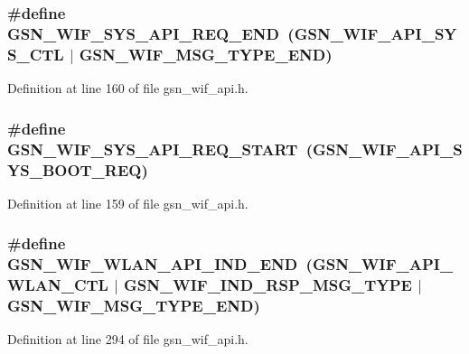 \hypertarget{a00606_ad4f159041961543262f326993fa41304}{
\subsubsection[{GSN\_\-WIF\_\-SYS\_\-API\_\-REQ\_\-END}]{\setlength{\rightskip}{0pt plus 5cm}\#define GSN\_\-WIF\_\-SYS\_\-API\_\-REQ\_\-END~(GSN\_\-WIF\_\-API\_\-SYS\_\-CTL $|$ GSN\_\-WIF\_\-MSG\_\-TYPE\_\-END)}}
\label{a00606_ad4f159041961543262f326993fa41304}


Definition at line 160 of file gsn\_\-wif\_\-api.h.

\hypertarget{a00606_a0b7c07d125cb7a93691b3df400da4260}{
\subsubsection[{GSN\_\-WIF\_\-SYS\_\-API\_\-REQ\_\-START}]{\setlength{\rightskip}{0pt plus 5cm}\#define GSN\_\-WIF\_\-SYS\_\-API\_\-REQ\_\-START~(GSN\_\-WIF\_\-API\_\-SYS\_\-BOOT\_\-REQ)}}
\label{a00606_a0b7c07d125cb7a93691b3df400da4260}


Definition at line 159 of file gsn\_\-wif\_\-api.h.

\hypertarget{a00606_a0b65635ab7d19cab097030c6a63afac6}{
\subsubsection[{GSN\_\-WIF\_\-WLAN\_\-API\_\-IND\_\-END}]{\setlength{\rightskip}{0pt plus 5cm}\#define GSN\_\-WIF\_\-WLAN\_\-API\_\-IND\_\-END~(GSN\_\-WIF\_\-API\_\-WLAN\_\-CTL $|$ GSN\_\-WIF\_\-IND\_\-RSP\_\-MSG\_\-TYPE $|$ GSN\_\-WIF\_\-MSG\_\-TYPE\_\-END)}}
\label{a00606_a0b65635ab7d19cab097030c6a63afac6}


Definition at line 294 of file gsn\_\-wif\_\-api.h.

